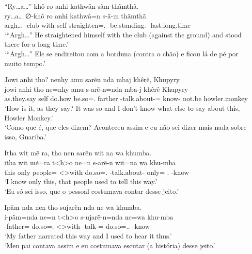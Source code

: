 \documentclass[output=paper,
modfonts,nonflat
]{langsci/langscibook}
\begin{document}
\newpage 
\ea  ``Ry\ldots{}a\ldots{}'' khô ro anhi kathwân sãm thãmthã. \\[.3em]
\gll ry\ldots{}a\ldots{} ∅-khô       ro   anhi kathwâ=n              s-ã-m                          thãmthã        \\
     argh\ldots{}        \Third-club with self straighten=\AAnd.\Ss{} \Third-be.standing.\Sg-\Nmlz{} last.long.time \\
\glt `{}``Argh\ldots{}'' He straightened himself with the club (against the ground) and stood there for a long time.' \\
     `{}``Argh\ldots{}'' Ele se endireitou com a borduna (contra o chão) e ficou lá de pé por muito tempo.' \\
\z

\ea  Jowi anhi tho? nenhy amu sarẽn nda mbaj khêrê, Khupyry. \\[.3em]
\gll jowi        anhi tho    ne=nhy           amu     s-arẽ-n=nda                      mba-j        khêrê  Khupyry       \\
     as.they.say self do.how be.so=\AAnd.\Ds{} farther \Third-talk.about-\Nmlz{}=\Det{} know-\Nmlz{} not.be howler.monkey \\
\glt `How is it, as they say? It was so and I don't know what else to say about this, Howler Monkey.'\footnotemark \\
     `Como que é, que eles dizem? Aconteceu assim e eu não sei dizer mais nada sobre isso, Guariba.' \\
\z

\ea  Itha wit mẽ ra, tho nen sarẽn wit na wa khumba. \\[.3em]
\gll itha wit  mẽ=ra         t<h>o        ne=n             s-arẽ-n                   wit=na        wa            khu-mba     \\
     this only people=\Nom{} <\Third>with do.so=\AAnd.\Ss{} \Third-talk.about-\Nmlz{} only=\N\Fut{} \First.\Nom{} \Third-know \\
\glt `I know only this, that people used to tell this way.' \\
     `Eu só sei isso, que o pessoal costumava contar desse jeito.' \\
\label{exe:nasecpos}
\z

\ea  Ipãm nda nen tho sujarẽn nda ne wa khumba. \\[.3em]
\gll i-pãm=nda            ne=n             t<h>o        s-ujarẽ-n=nda              ne=wa                   khu-mba     \\
     \First-father=\Nom{} do.so=\AAnd.\Ss{} <\Third>with \Third-talk-\Nmlz{}=\Det{} do.so=\AAnd.\Ds.\First{} \Third-know \\
\glt `My father narrated this way and I used to hear it thus.' \\
     `Meu pai contava assim e eu costumava escutar (a história) desse jeito.' \\
\z
\end{document}
